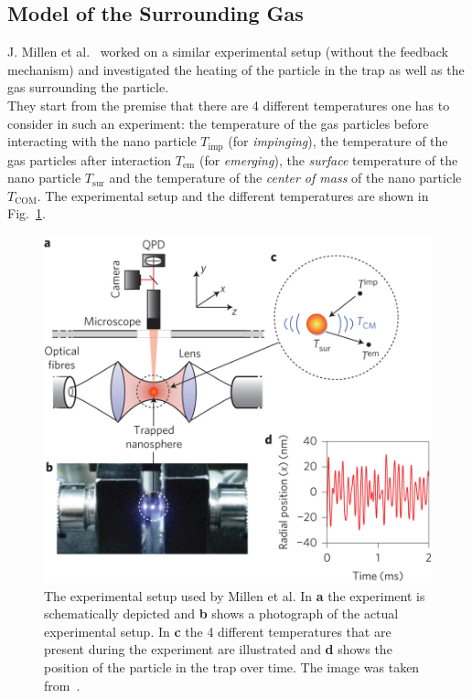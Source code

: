 \documentclass[12pt]{article}
\begin{document}
\subsection{Model of the Surrounding Gas}
J. Millen et al.~\cite{MillenJ.2014} worked on a similar experimental setup (without the feedback mechanism) and investigated the heating of the
particle in the trap as well as the gas surrounding the particle.\\
They start from the premise that there are 4 different temperatures one has to consider in such an experiment: the temperature of the gas particles
before interacting with the nano particle $T_\text{imp}$ (for \textit{impinging}), the temperature of the gas particles after 
interaction $T_\text{em}$ (for \textit{emerging}), the \textit{surface} temperature of the nano particle $T_\text{sur}$ and the temperature of the 
\textit{center of mass} of the nano particle $T_\text{COM}$. The experimental setup
and the different temperatures are shown in Fig.~\ref{fig:levitation}.\\
\begin{figure}[H]
    \begin{center}
        \includegraphics[scale=0.2]{images/nnano_millen.jpg}
        \caption{The experimental setup used by Millen et al. In \textbf{a} the experiment is schematically depicted and \textbf{b} shows a photograph
            of the actual experimental setup. In \textbf{c} the 4 different temperatures that are present during the experiment are illustrated and
        \textbf{d} shows the position of the particle in the trap over time. The image was taken from~\cite{MillenJ.2014}.}
        \label{fig:levitation}
    \end{center}
\end{figure}
\end{document}
